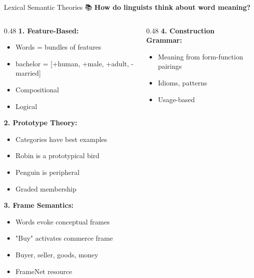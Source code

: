 \documentclass[aspectratio=169]{beamer}
\begin{document}
\begin{frame}[shrink=10]{Lexical Semantic Theories 📚}
\textbf{How do linguists think about word meaning?}

\vspace{1em}

\begin{columns}[T]
\begin{column}{0.48\textwidth}
\textbf{1. Feature-Based:}
\begin{itemize}\setlength{\itemsep}{0pt}
    \item Words = bundles of features
    \item bachelor = [+human, +male, +adult, -married]
    \item Compositional
    \item Logical
\end{itemize}

\vspace{0.3em}
\textbf{2. Prototype Theory:}
\begin{itemize}\setlength{\itemsep}{0pt}
    \item Categories have best examples
    \item Robin is a prototypical bird
    \item Penguin is peripheral
    \item Graded membership
\end{itemize}

\vspace{0.3em}
\textbf{3. Frame Semantics:}
\begin{itemize}\setlength{\itemsep}{0pt}
    \item Words evoke conceptual frames
    \item "Buy" activates commerce frame
    \item Buyer, seller, goods, money
    \item FrameNet resource
\end{itemize}
\end{column}

\begin{column}{0.48\textwidth}
\textbf{4. Construction Grammar:}
\begin{itemize}\setlength{\itemsep}{0pt}
    \item Meaning from form-function pairings
    \item Idioms, patterns
    \item Usage-based
\end{itemize}


\end{column}
\end{columns}
\end{frame}
\end{document}
